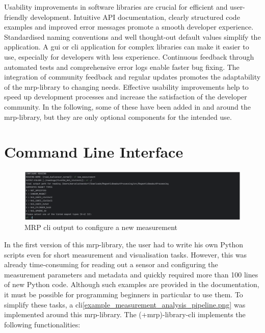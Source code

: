 Usability improvements in software libraries are crucial for efficient
and user-friendly development. Intuitive API documentation, clearly
structured code examples and improved error messages promote a smooth
developer experience. Standardised naming conventions and well
thought-out default values simplify the application. A \gls{gui} or
\gls{cli} application for complex libraries can make it easier to use,
especially for developers with less experience. Continuous feedback
through automated tests and comprehensive error logs enable faster bug
fixing. The integration of community feedback and regular updates
promotes the adaptability of the \gls{mrp}-library to changing needs.
Effective usability improvements help to speed up development processes
and increase the satisfaction of the developer community. In the
following, some of these have been added in and around the
\gls{mrp}-library, but they are only optional components for the
intended use.

\hypertarget{command-line-interface}{%
\section{Command Line Interface}\label{command-line-interface}}

\begin{figure}
\centering
\includegraphics{./generated_images/border_MRP_(+cli)_output_to_configure_a_new_measurement.png}
\caption{MRP \gls{cli} output to configure a new measurement
\label{MRP_(+cli)_output_to_configure_a_new_measurement.png}}
\end{figure}

In the first version of this \gls{mrp}-library, the user had to write
his own Python scripts even for short measurement and visualisation
tasks. However, this was already time-consuming for reading out a sensor
and configuring the measurement parameters and metadata and quickly
required more than 100 lines of new Python code. Although such examples
are provided in the documentation, it must be possible for programming
beginners in particular to use them. To simplify these tasks, a
\gls{cli}\ref{example_measurement_analysis_pipeline.png} was implemented
around this \gls{mrp}-library. The (+mrp)-library-\gls{cli} implements
the following functionalities:

